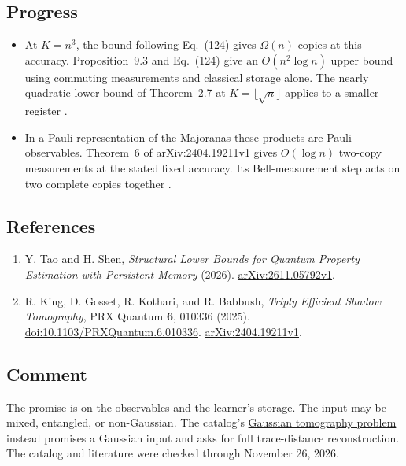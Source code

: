 \subsection*{Progress}

\begin{itemize}
  \item At $K=n^3$, the bound following Eq.~(124) gives $\Omega(n)$ copies at this accuracy. Proposition~9.3 and Eq.~(124) give an $O(n^2\log n)$ upper bound using commuting measurements and classical storage alone. The nearly quadratic lower bound of Theorem~2.7 at $K=\lfloor\sqrt n\rfloor$ applies to a smaller register .

  \item In a Pauli representation of the Majoranas these products are Pauli observables. Theorem~6 of arXiv:2404.19211v1 gives $O(\log n)$ two-copy measurements at the stated fixed accuracy. Its Bell-measurement step acts on two complete copies together .
\end{itemize}

\subsection*{References}

\begin{enumerate}[label={},leftmargin=4.8em,labelsep=0.5em]
  \footnotesize
  \item[\textup{[TS26]}]\label{ref:d12-majorana-memory}
  Y. Tao and H. Shen, \emph{Structural Lower Bounds for Quantum Property Estimation with Persistent Memory} (2026). \href{https://arxiv.org/abs/2611.05792v1}{arXiv:2611.05792v1}.

  \item[\textup{[KGKB25]}]\label{ref:d12-two-copy}
  R. King, D. Gosset, R. Kothari, and R. Babbush, \emph{Triply Efficient Shadow Tomography}, PRX Quantum \textbf{6}, 010336 (2025). \href{https://doi.org/10.1103/PRXQuantum.6.010336}{doi:10.1103/PRXQuantum.6.010336}. \href{https://arxiv.org/abs/2404.19211v1}{arXiv:2404.19211v1}.
\end{enumerate}

\subsection*{Comment}

The promise is on the observables and the learner's storage. The input may be mixed, entangled, or non-Gaussian. The catalog's \href{https://qiqc-op.com/problem/op_91c81ca77b99eebf/}{Gaussian tomography problem} instead promises a Gaussian input and asks for full trace-distance reconstruction. The catalog and literature were checked through November 26, 2026.

